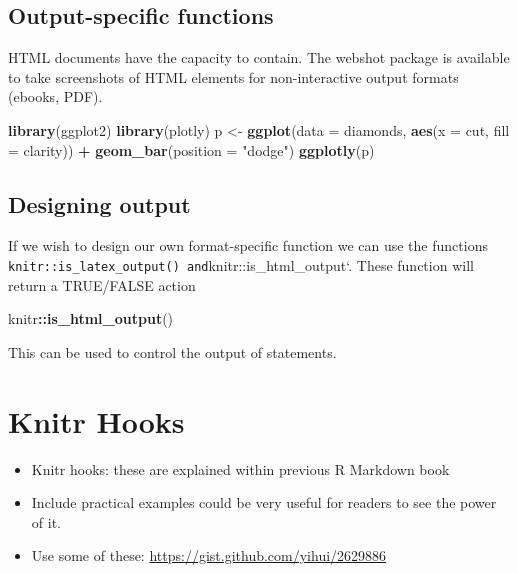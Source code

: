 \documentclass[]{book}
\newenvironment{Shaded}{\begin{snugshade}}{\end{snugshade}}
\newcommand{\KeywordTok}[1]{\textcolor[rgb]{0.13,0.29,0.53}{\textbf{#1}}}
\newcommand{\DataTypeTok}[1]{\textcolor[rgb]{0.13,0.29,0.53}{#1}}
\newcommand{\StringTok}[1]{\textcolor[rgb]{0.31,0.60,0.02}{#1}}
\newcommand{\OperatorTok}[1]{\textcolor[rgb]{0.81,0.36,0.00}{\textbf{#1}}}
\newcommand{\NormalTok}[1]{#1}
\providecommand{\tightlist}{%
  \setlength{\itemsep}{0pt}\setlength{\parskip}{0pt}}
\begin{document}
\section{Output-specific functions}\label{output-specific-functions}

HTML documents have the capacity to contain. The webshot package is
available to take screenshots of HTML elements for non-interactive
output formats (ebooks, PDF).

\begin{Shaded}
\begin{Highlighting}[]
\KeywordTok{library}\NormalTok{(ggplot2)}
\KeywordTok{library}\NormalTok{(plotly)}
\NormalTok{p <-}\StringTok{ }\KeywordTok{ggplot}\NormalTok{(}\DataTypeTok{data =}\NormalTok{ diamonds, }\KeywordTok{aes}\NormalTok{(}\DataTypeTok{x =}\NormalTok{ cut, }\DataTypeTok{fill =}\NormalTok{ clarity)) }\OperatorTok{+}
\StringTok{            }\KeywordTok{geom_bar}\NormalTok{(}\DataTypeTok{position =} \StringTok{"dodge"}\NormalTok{)}
\KeywordTok{ggplotly}\NormalTok{(p)}
\end{Highlighting}
\end{Shaded}

\section{Designing output}\label{designing-output}

If we wish to design our own format-specific function we can use the
functions
\texttt{knitr::is\_latex\_output()\ and}knitr::is\_html\_output`. These
function will return a TRUE/FALSE action

\begin{Shaded}
\begin{Highlighting}[]
\NormalTok{knitr}\OperatorTok{::}\KeywordTok{is_html_output}\NormalTok{()}
\end{Highlighting}
\end{Shaded}

This can be used to control the output of statements.

\chapter{Knitr Hooks}\label{knitr-hooks}

\begin{itemize}
\tightlist
\item
  Knitr hooks: these are explained within previous R Markdown book
\item
  Include practical examples could be very useful for readers to see the
  power of it.
\item
  Use some of these: \url{https://gist.github.com/yihui/2629886}
\end{itemize}
\end{document}
